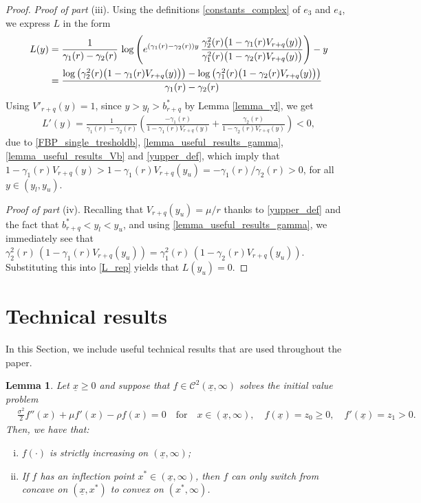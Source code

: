 \documentclass[11pt]{article} %
\newtheorem{lemma}[theorem]{Lemma}
\newcommand{\ubar}[1]{\underaccent{\bar}{#1}}
\numberwithin{komcounter}{section}
\renewcommand{\ubar}{\underline}
\renewcommand{\bar}{\overline}
\numberwithin{equation}{section}
\numberwithin{theorem}{section}
\begin{document}
\begin{proof}
\vspace{1mm}
{\it Proof of part} (iii).
Using the definitions \eqref{constants_complex} of $e_3$ and $e_4$, we express $L$ in the form  
\begin{align}
L(y)
&= \frac{1}{\gamma_1(r)-\gamma_2(r)} \,  \log\left(e^{(\gamma_1(r)-\gamma_2(r))y} \, \frac{\gamma_2^2(r) \big(1-\gamma_1(r)V_{r+q}(y) \big)}{\gamma_1^2(r) \big(1-\gamma_2(r)V_{r+q}(y) \big)}\right) - y \label{L_rep}\\
&=\frac{\log\left(\gamma_2^2(r) \big(1-\gamma_1(r)V_{r+q}(y) \big)\right)-\log\left(\gamma_1^2(r) \big(1-\gamma_2(r)V_{r+q}(y) \big)\right)}{\gamma_1(r)-\gamma_2(r)}\notag
\end{align}
Using $V'_{r+q}(y)=1$, since $y>y_l>b_{r+q}^*$ by Lemma \ref{lemma_yl}, we get
\begin{align*}
L'(y)=\frac{1}{\gamma_1(r)-\gamma_2(r)}\left(\frac{-\gamma_1(r)}{1-\gamma_1(r)V_{r+q}(y)}+\frac{\gamma_2(r)}{1-\gamma_2(r)V_{r+q}(y)}\right)<0,
\end{align*}
due to \eqref{FBP_single_tresholdb}, \eqref{lemma_useful_results_gamma}, \eqref{lemma_useful_results_Vb} and \eqref{yupper_def}, which imply that $1 - \gamma_1(r)V_{r+q}(y) > 1 - \gamma_1(r)V_{r+q}(y_u) = -\gamma_1(r)/\gamma_2(r) > 0$, for all $y \in (y_l, y_u)$. 

\vspace{1mm}
{\it Proof of part} (iv). 
Recalling that $V_{r+q}(y_u)=\mu/r$ thanks to \eqref{yupper_def} and the fact that $b^*_{r+q} < y_l < y_u$, and using  \eqref{lemma_useful_results_gamma}, we immediately see that 
$\gamma_2^2(r) \, (1-\gamma_1(r)V_{r+q}(y_u)) = \gamma_1^2(r) \, (1-\gamma_2(r)V_{r+q}(y_u))$. 
Substituting this into \eqref{L_rep} yields that $L(y_u)=0$.
\end{proof}



\section{Technical results}
\label{sec:auxiliary}

In this Section, we include useful technical results that are used throughout the paper.


\begin{lemma}\label{Lemma_ODE_Sol}
Let $\ubar{x} \geq 0$ and suppose that $f\in \mathcal{C}^2(\ubar{x},\infty)$ solves the initial value problem
\begin{align*}
&\frac{\sigma^2}{2}f''(x)+\mu f'(x)-\rho f(x)=0 \quad \text{for} \quad x\in (\ubar{x},\infty) , 
\quad f(\ubar{x}) = z_0  \geq 0, 
\quad f'(\ubar{x}) = z_1 >0.
\end{align*}
Then, we have that:
\begin{enumerate}[(i)]
\item $f(\cdot)$ is strictly increasing on $(\ubar{x},\infty)$;
\item If $f$ has an inflection point $x^* \in (\ubar{x},\infty)$, then $f$ can only switch from concave on $(\ubar{x},x^*)$ to convex on $(x^*,\infty)$.
\end{enumerate}
\end{lemma}
\end{document}

